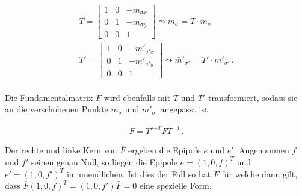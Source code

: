 
\begin{gather}
	T = \begin{bmatrix}
	1&0&-m_{\sigma x}\\
	0&1&-m_{\sigma y}\\
	0&0&1
	\end{bmatrix} \leadsto \bar{m_\sigma} = T\cdot m_\sigma\\
	T' = \begin{bmatrix}
	1&0&-m'_{\sigma'x}\\
	0&1&-m'_{\sigma'y}\\
	0&0&1
	\end{bmatrix} \leadsto 	\bar{m}'_{\sigma'} = T' \cdot m'_{\sigma'} \, .
\end{gather} \\

Die Fundamentalmatrix $F$ wird ebenfalls mit $T$ und $T'$ transformiert, sodass sie an die verschobenen Punkte $\bar{m}_{\sigma}$ und $\bar{m}'_{\sigma'}$ angepasst ist
%

\begin{gather}
	\bar{F}= T'^{-T}FT^{-1} \, .
\end{gather}

Der rechte und linke Kern von $\bar{F}$ ergeben die Epipole $\bar{e}$ und $\bar{e}'$. Angenommen $f$ und $f'$ seinen genau Null, so liegen die Epipole $e = (1,0,f)^T$ und $e' = (1,0,f')^T$ im unendlichen. Ist dies der Fall so hat $\bar{F}$ für welche dann gilt, dass $\bar{F}(1,0,f)^T = (1,0,f')\bar{F}=0$ eine spezielle Form\cite{HZ}.




